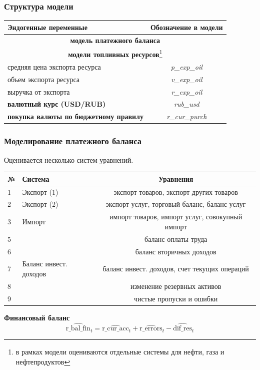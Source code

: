 \documentclass[9pt]{beamer}
\begin{document}
\begin{frame}
	\frametitle{Структура модели}
	\begin{center}
	\small
	\begin{tabular}{ l | c }
		\toprule
		Эндогенные переменные  &  Обозначение в модели  \\
		\midrule
		\multicolumn{2}{c}{\textbf{модель платежного баланса}} \\
		\midrule
		\multicolumn{2}{c}{\textbf{модели топливных ресурсов}\footnote[1]{в рамках модели оцениваются отдельные системы для нефти, газа и нефтепродуктов}}\\
		\midrule
		средняя цена экспорта ресурса & \textit{ p\_exp\_oil } \\ 
		объем экспорта ресурса & \textit{ v\_exp\_oil } \\
		выручка от экспорта &  \textit{ r\_exp\_oil } \\ 
		\midrule
		\textbf{валютный курс (USD/RUB)} & \textit{ rub\_usd } \\ 
		\midrule
		\textbf{покупка валюты по бюджетному правилу} & \textit{ r\_cur\_purch } \\ 
		\bottomrule
	\end{tabular}
	\label{tab:1} 
\end{center}
\end{frame}

\begin{frame}
	\frametitle{Моделирование платежного баланса}
	Оценивается несколько систем уравнений.
	
	\begin{center}
		\small
		\begin{tabular}{l | l | c }
			\toprule
			№ & Система  &  Уравнения  \\
			\midrule
			1 & Экспорт (1) & экспорт товаров, экспорт других товаров \\ 
			\midrule
			2 & Экспорт (2) & экспорт услуг, торговый баланс, баланс услуг \\
			\midrule
			3 & Импорт & импорт товаров, импорт услуг, совокупный импорт \\
			\midrule
			5 &  & баланс оплаты труда \\
			\midrule
			6 &  & баланс вторичных доходов \\
			\midrule
			7 & Баланс инвест. доходов & баланс инвест. доходов, счет текущих операций \\
			\midrule
			8 &  & изменение резервных активов \\
			\midrule
			9 &  & чистые пропуски и ошибки \\
			\bottomrule			
		\end{tabular}
		\label{tab:8} 
		\normalsize
	\end{center}

	\textbf{Финансовый баланс}	
			\[
	\widehat{\text{r\_bal\_fin}}_t = \widehat{\text{r\_cur\_acc}}_t + \widehat{\text{r\_errors}}_t - \widehat{\text{dif\_res}}_t
	\]
	
\end{frame}
\end{document}
